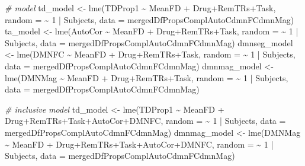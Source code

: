 \documentclass[
]{article}
\newenvironment{Shaded}{\begin{snugshade}}{\end{snugshade}}
\newcommand{\AttributeTok}[1]{\textcolor[rgb]{0.77,0.63,0.00}{#1}}
\newcommand{\CommentTok}[1]{\textcolor[rgb]{0.56,0.35,0.01}{\textit{#1}}}
\newcommand{\DecValTok}[1]{\textcolor[rgb]{0.00,0.00,0.81}{#1}}
\newcommand{\FunctionTok}[1]{\textcolor[rgb]{0.00,0.00,0.00}{#1}}
\newcommand{\NormalTok}[1]{#1}
\newcommand{\OtherTok}[1]{\textcolor[rgb]{0.56,0.35,0.01}{#1}}
\newcommand{\SpecialCharTok}[1]{\textcolor[rgb]{0.00,0.00,0.00}{#1}}
\begin{document}
\begin{Shaded}
\begin{Highlighting}[]
\CommentTok{\# model}
\NormalTok{td\_model }\OtherTok{\textless{}{-}} \FunctionTok{lme}\NormalTok{(TDProp1 }\SpecialCharTok{\textasciitilde{}}\NormalTok{ MeanFD }\SpecialCharTok{+}\NormalTok{ Drug}\SpecialCharTok{+}\NormalTok{RemTRs}\SpecialCharTok{+}\NormalTok{Task, }\AttributeTok{random =} \SpecialCharTok{\textasciitilde{}} \DecValTok{1} \SpecialCharTok{|}\NormalTok{ Subjects, }\AttributeTok{data =}\NormalTok{ mergedDfPropsComplAutoCdmnFCdmnMag)}
\NormalTok{ta\_model }\OtherTok{\textless{}{-}} \FunctionTok{lme}\NormalTok{(AutoCor }\SpecialCharTok{\textasciitilde{}}\NormalTok{ MeanFD }\SpecialCharTok{+}\NormalTok{ Drug}\SpecialCharTok{+}\NormalTok{RemTRs}\SpecialCharTok{+}\NormalTok{Task, }\AttributeTok{random =} \SpecialCharTok{\textasciitilde{}} \DecValTok{1} \SpecialCharTok{|}\NormalTok{ Subjects, }\AttributeTok{data =}\NormalTok{ mergedDfPropsComplAutoCdmnFCdmnMag)}
\NormalTok{dmnseg\_model }\OtherTok{\textless{}{-}} \FunctionTok{lme}\NormalTok{(DMNFC }\SpecialCharTok{\textasciitilde{}}\NormalTok{ MeanFD }\SpecialCharTok{+}\NormalTok{ Drug}\SpecialCharTok{+}\NormalTok{RemTRs}\SpecialCharTok{+}\NormalTok{Task, }\AttributeTok{random =} \SpecialCharTok{\textasciitilde{}} \DecValTok{1} \SpecialCharTok{|}\NormalTok{ Subjects, }\AttributeTok{data =}\NormalTok{ mergedDfPropsComplAutoCdmnFCdmnMag)}
\NormalTok{dmnmag\_model }\OtherTok{\textless{}{-}} \FunctionTok{lme}\NormalTok{(DMNMag }\SpecialCharTok{\textasciitilde{}}\NormalTok{ MeanFD }\SpecialCharTok{+}\NormalTok{ Drug}\SpecialCharTok{+}\NormalTok{RemTRs}\SpecialCharTok{+}\NormalTok{Task, }\AttributeTok{random =} \SpecialCharTok{\textasciitilde{}} \DecValTok{1} \SpecialCharTok{|}\NormalTok{ Subjects, }\AttributeTok{data =}\NormalTok{ mergedDfPropsComplAutoCdmnFCdmnMag)}

\CommentTok{\# inclusive model}
\NormalTok{td\_model }\OtherTok{\textless{}{-}} \FunctionTok{lme}\NormalTok{(TDProp1 }\SpecialCharTok{\textasciitilde{}}\NormalTok{ MeanFD }\SpecialCharTok{+}\NormalTok{ Drug}\SpecialCharTok{+}\NormalTok{RemTRs}\SpecialCharTok{+}\NormalTok{Task}\SpecialCharTok{+}\NormalTok{AutoCor}\SpecialCharTok{+}\NormalTok{DMNFC, }\AttributeTok{random =} \SpecialCharTok{\textasciitilde{}} \DecValTok{1} \SpecialCharTok{|}\NormalTok{ Subjects, }\AttributeTok{data =}\NormalTok{ mergedDfPropsComplAutoCdmnFCdmnMag)}
\NormalTok{dmnmag\_model }\OtherTok{\textless{}{-}} \FunctionTok{lme}\NormalTok{(DMNMag }\SpecialCharTok{\textasciitilde{}}\NormalTok{ MeanFD }\SpecialCharTok{+}\NormalTok{ Drug}\SpecialCharTok{+}\NormalTok{RemTRs}\SpecialCharTok{+}\NormalTok{Task}\SpecialCharTok{+}\NormalTok{AutoCor}\SpecialCharTok{+}\NormalTok{DMNFC, }\AttributeTok{random =} \SpecialCharTok{\textasciitilde{}} \DecValTok{1} \SpecialCharTok{|}\NormalTok{ Subjects, }\AttributeTok{data =}\NormalTok{ mergedDfPropsComplAutoCdmnFCdmnMag)}


\end{Highlighting}
\end{Shaded}
\end{document}
